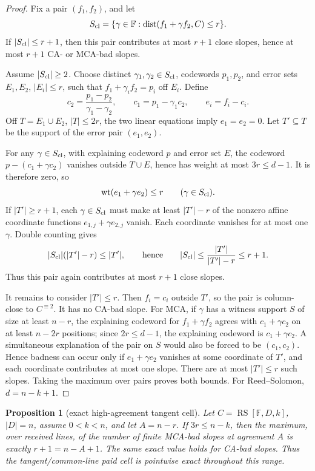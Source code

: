 \documentclass[a4paper,11pt]{amsart}
\newtheorem{proposition}[theorem]{Proposition}
\theoremstyle{remark}
\newcommand{\F}{\mathbb F}
\newcommand{\RS}{\operatorname{RS}}
\newcommand{\dist}{\operatorname{dist}}
\newcommand{\wt}{\operatorname{wt}}
\begin{document}
\begin{proof}
Fix a pair \((f_1,f_2)\), and let
\[
        S_{\rm cl}=\{\gamma\in\F:\dist(f_1+\gamma f_2,C)\le r\}.
\]
If \(|S_{\rm cl}|\le r+1\), then this pair contributes at most \(r+1\) close slopes, hence at most \(r+1\) CA- or MCA-bad slopes.

Assume \(|S_{\rm cl}|\ge2\).  Choose distinct \(\gamma_1,\gamma_2\in S_{\rm cl}\), codewords \(p_1,p_2\), and error sets \(E_1,E_2\), \(|E_i|\le r\), such that \(f_1+\gamma_i f_2=p_i\) off \(E_i\).  Define
\[
        c_2=\frac{p_1-p_2}{\gamma_1-\gamma_2},
        \qquad
        c_1=p_1-\gamma_1c_2,
        \qquad
        e_i=f_i-c_i .
\]
Off \(T=E_1\cup E_2\), \(|T|\le2r\), the two linear equations imply \(e_1=e_2=0\).  Let \(T'\subseteq T\) be the support of the error pair \((e_1,e_2)\).

For any \(\gamma\in S_{\rm cl}\), with explaining codeword \(p\) and error set \(E\), the codeword \(p-(c_1+\gamma c_2)\) vanishes outside \(T\cup E\), hence has weight at most \(3r\le d-1\).  It is therefore zero, so
\[
        \wt(e_1+\gamma e_2)\le r
        \qquad(\gamma\in S_{\rm cl}).
\]
If \(|T'|\ge r+1\), each \(\gamma\in S_{\rm cl}\) must make at least \(|T'|-r\) of the nonzero affine coordinate functions \(e_{1,j}+\gamma e_{2,j}\) vanish.  Each coordinate vanishes for at most one \(\gamma\).  Double counting gives
\[
        |S_{\rm cl}|(|T'|-r)\le |T'|,
        \qquad\text{hence}\qquad
        |S_{\rm cl}|\le \frac{|T'|}{|T'|-r}\le r+1.
\]
Thus this pair again contributes at most \(r+1\) close slopes.

It remains to consider \(|T'|\le r\).  Then \(f_i=c_i\) outside \(T'\), so the pair is column-close to \(C^{\equiv2}\).  It has no CA-bad slope.  For MCA, if \(\gamma\) has a witness support \(S\) of size at least \(n-r\), the explaining codeword for \(f_1+\gamma f_2\) agrees with \(c_1+\gamma c_2\) on at least \(n-2r\) positions; since \(2r\le d-1\), the explaining codeword is \(c_1+\gamma c_2\).  A simultaneous explanation of the pair on \(S\) would also be forced to be \((c_1,c_2)\).  Hence badness can occur only if \(e_1+\gamma e_2\) vanishes at some coordinate of \(T'\), and each coordinate contributes at most one slope.  There are at most \(|T'|\le r\) such slopes.  Taking the maximum over pairs proves both bounds.  For Reed--Solomon, \(d=n-k+1\).
\end{proof}

\begin{proposition}[exact high-agreement tangent cell]\label{prop:exact-tangent-cell}
Let \(C=\RS[\F,D,k]\), \(|D|=n\), assume \(0<k<n\), and let \(A=n-r\).  If \(3r\le n-k\), then the maximum, over received lines, of the number of finite MCA-bad slopes at agreement \(A\) is exactly \(r+1=n-A+1\).  The same exact value holds for CA-bad slopes.  Thus the tangent/common-line paid cell is pointwise exact throughout this range.
\end{proposition}
\end{document}
